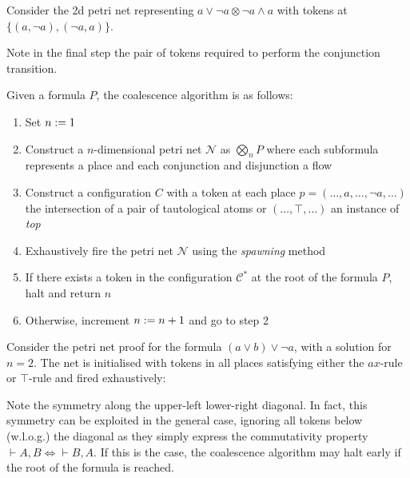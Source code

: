     \begin{example}
        Consider the 2d petri net representing $a \vee \neg a \otimes \neg a \wedge a$ with tokens at $\{(a, \neg a), (\neg a, a)\}$.
        
        Note in the final step the pair of tokens required to perform the conjunction transition.
    \end{example}


    \begin{definition}[Coalescence]
        Given a formula $P$, the coalescence algorithm is as follows:
        \begin{enumerate}[nosep]
            \item Set  $n := 1$
            \item Construct a $n$-dimensional petri net $\mathcal{N}$ as $\bigotimes_n P$ where each subformula represents a place and each conjunction and disjunction a flow
            \item Construct a configuration $C$ with a token at each place $p = (\ldots, a, \ldots, \neg a, \ldots)$ the intersection of a pair of tautological atoms or $(\ldots, \top, \ldots)$ an instance of \textit{top}
            \item Exhaustively fire the petri net $\mathcal{N}$ using the \textit{spawning} method
            \item If there exists a token in the configuration $\mathcal{C^*}$ at the root of the formula $P$, halt and return $n$
            \item Otherwise, increment $n := n + 1$ and go to step 2
        \end{enumerate}
    \end{definition}
    
    \begin{example}
        Consider the petri net proof for the formula $(a \vee b) \vee \neg a$, with a solution for $n = 2$.
        The net is initialised with tokens in all places satisfying either the $ax$-rule or $\top$-rule and fired exhaustively:
        
    \end{example}

    \begin{remark}
        Note the symmetry along the upper-left lower-right diagonal.
        In fact, this symmetry can be exploited in the general case, ignoring all tokens below (w.l.o.g.) the diagonal as they simply express the commutativity property $\vdash A, B \iff \vdash B, A$.
        If this is the case, the coalescence algorithm may halt early if the root of the formula is reached.
    \end{remark}

